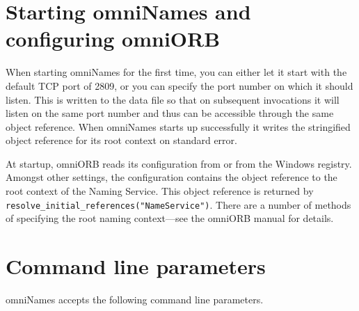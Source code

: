 \documentclass[a4paper,11pt]{article}
\newcommand{\code}[1]{\texttt{#1}}
\newcommand{\file}{\begingroup \urlstyle{tt}\Url}
\begin{document}
\section{Starting omniNames and configuring omniORB}

When starting omniNames for the first time, you can either let it
start with the default TCP port of 2809, or you can specify the port
number on which it should listen.  This is written to the data file so
that on subsequent invocations it will listen on the same port number
and thus can be accessible through the same object reference.  When
omniNames starts up successfully it writes the stringified object
reference for its root context on standard error.

At startup, omniORB reads its configuration from \file{omniORB.cfg} or
from the Windows registry. Amongst other settings, the configuration
contains the object reference to the root context of the Naming
Service.  This object reference is returned by
\code{resolve\_initial\_references("NameService")}. There are a number
of methods of specifying the root naming context---see the omniORB
manual for details.

\section{Command line parameters}

omniNames accepts the following command line parameters.

\vspace{\baselineskip}
\end{document}
